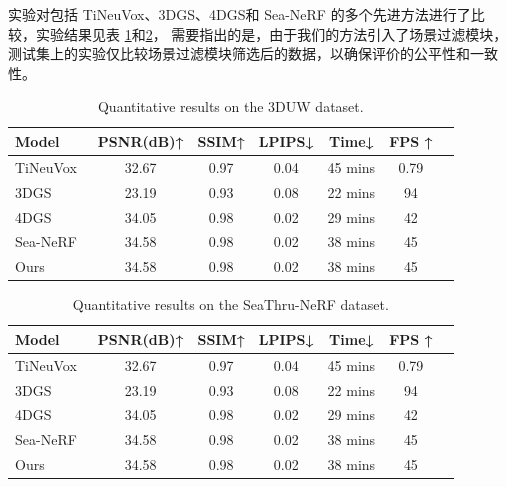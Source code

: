 实验对包括 TiNeuVox\cite{tineuvox}、3DGS\cite{3DGS}、4DGS\cite{4DGS}和 Sea-NeRF\cite{seathru}
的多个先进方法进行了比较，实验结果见表 \ref{tab:res_3duw}和\ref{tab:res_seanerf}，
需要指出的是，由于我们的方法引入了场景过滤模块，测试集上的实验仅比较场景过滤模块筛选后的数据，以确保评价的公平性和一致性。
\begin{table} [htbp]
    \small
    \centering
    \caption{Quantitative results on the 3DUW dataset. }
    \setlength{\tabcolsep}{10pt}
    \begin{tabular}{lcccccc} 
    \toprule
    Model  & PSNR(dB)↑ & SSIM↑ & LPIPS↓ & Time↓ &  FPS ↑  \\
    \midrule  
    TiNeuVox~\cite{tineuvox}  & 32.67 & 0.97 &  0.04 & 45 mins & 0.79\\ 
    3DGS~\cite{3DGS} &23.19 & 0.93 & 0.08&22 mins  &94\\
    4DGS\cite{4DGS} & 34.05&0.98 &0.02& 29 mins&42 \\
    Sea-NeRF\cite{seathru} & 34.58 & 0.98 & 0.02 & 38 mins & 45\\
    Ours & 34.58 & 0.98 & 0.02 & 38 mins & 45\\
    \bottomrule
    \end{tabular}  
    \label{tab:res_3duw}
\end{table}
    
\begin{table} [htbp]
    \small
    \centering
    \caption{Quantitative results on the SeaThru-NeRF dataset. }
    \setlength{\tabcolsep}{10pt}
    \begin{tabular}{lcccccc} 
    \toprule
    Model  & PSNR(dB)↑ & SSIM↑ & LPIPS↓ & Time↓ &  FPS ↑  \\ 
    \midrule  
    TiNeuVox~\cite{tineuvox}  & 32.67 & 0.97 &  0.04 & 45 mins & 0.79\\ 
    3DGS~\cite{3DGS} &23.19 & 0.93 & 0.08&22 mins  &94\\
    4DGS\cite{4DGS} & 34.05&0.98 &0.02& 29 mins&42 \\
    Sea-NeRF\cite{seathru} & 34.58 & 0.98 & 0.02 & 38 mins & 45\\
    Ours & 34.58 & 0.98 & 0.02 & 38 mins & 45\\
    \bottomrule
    \end{tabular}  
    
    \label{tab:res_seanerf}
\end{table}

